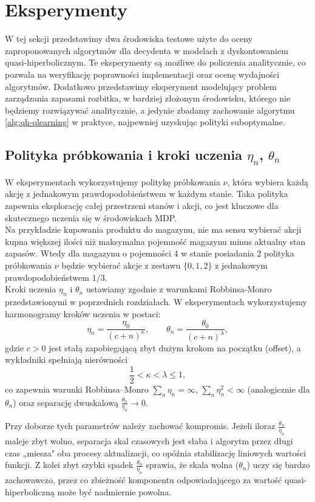 \chapter{Eksperymenty}
W tej sekcji przedstawimy dwa środowiska testowe użyte do oceny zaproponowanych algorytmów dla decydenta w modelach z dyskontowaniem quasi-hiperbolicznym. Te eksperymenty są możliwe do policzenia analitycznie, co pozwala na weryfikację poprawności implementacji oraz ocenę wydajności algorytmów. Dodatkowo przedstawimy eksperyment modelujący problem zarządzania zapasami rozbitka, w bardziej złożonym środowisku, którego nie będziemy rozwiązywać analitycznie, a jedynie zbadamy zachowanie algorytmu \ref{alg:qh-qlearning} w praktyce, najpewniej uzyskując polityki suboptymalne.
\section{Polityka próbkowania i kroki uczenia $\eta_n$, $\theta_n$}
W eksperymentach wykorzystujemy politykę próbkowania $\nu$, która wybiera każdą akcję z jednakowym prawdopodobieństwem w każdym stanie. Taka polityka zapewnia eksplorację całej przestrzeni stanów i akcji, co jest kluczowe dla skutecznego uczenia się w środowiskach MDP. \\
Na przykładzie kupowania produktu do magazynu, nie ma sensu wybierać akcji kupna większej ilości niż maksymalna pojemność magazynu minus aktualny stan zapasów. Wtedy dla magazynu o pojemności 4 w stanie posiadania 2 polityka próbkowania $\nu$ będzie wybierać akcje z zestawu $\{0, 1, 2\}$ z jednakowym prawdopodobieństwem $1/3$. \\
Kroki uczenia $\eta_n$ i $\theta_n$ ustawiamy zgodnie z warunkami Robbinsa-Monro przedstawionymi w poprzednich rozdziałach. W eksperymentach wykorzystujemy harmonogramy kroków uczenia w postaci:
\[
\eta_n = \frac{\eta_0}{(c + n)^{\kappa}},
\qquad
\theta_n = \frac{\theta_0}{(c + n)^{\lambda}},
\]
gdzie $c>0$ jest stałą zapobiegającą zbyt dużym krokom na początku (offset), a wykładniki spełniają nierówności
\[
\frac{1}{2} < \kappa < \lambda \le 1,
\]
co zapewnia warunki Robbinsa--Monro $\sum\limits_n \eta_n = \infty$, $\sum\limits_n \eta_n^2 < \infty$ (analogicznie dla $\theta_n$) oraz separację dwuskalową $\frac{\theta_n}{\eta_n} \to 0$.

Przy doborze tych parametrów należy zachować kompromis. Jeżeli iloraz $\frac{\theta_n}{\eta_n}$ maleje zbyt wolno, separacja skal czasowych jest słaba i algorytm przez długi czas „miesza" oba procesy aktualizacji, co opóźnia stabilizację liniowych wartości funkcji. Z kolei zbyt szybki spadek $\frac{\theta_n}{\eta_n}$ sprawia, że skala wolna ($\theta_n$) uczy się bardzo zachowawczo, przez co zbieżność komponentu odpowiadającego za wartość quasi-hiperboliczną może być nadmiernie powolna.

